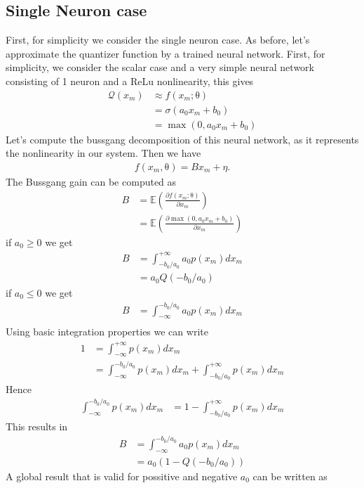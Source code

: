 \documentclass[12pt]{article}
\newcommand{\vect}[1]{\boldsymbol{\mathrm{#1}}}
\newcommand{\expt}[1]{\mathbb{E}\left(#1\right)}
\theoremstyle{remark}
\begin{document}
\subsection{Single Neuron case}
First, for simplicity we consider the single neuron case. As before, let's approximate the quantizer function by a trained neural network. First, for simplicity, we consider the scalar case and a very simple neural network consisting of 1 neuron and a ReLu nonlinearity, this gives
\begin{align}
	\mathcal{Q}(x_m) &\approx f(x_m; \vect{\theta})\\
	&= \sigma(a_0x_m + b_0)\\
	&= \max(0, a_0x_m + b_0)
\end{align}
Let's compute the bussgang decomposition of this neural network, as it represents the nonlinearity in our system. Then we have
\begin{align}
	f(x_m, \vect{\theta}) = B x_m + \eta.
\end{align}
The Bussgang gain can be computed as 
\begin{align}
	B &= \expt{\frac{\partial f(x_m; \vect{\theta})}{\partial x_m}}\\
	&= \expt{\frac{\partial \max(0, a_0x_m + b_0) }{\partial x_m}}
\end{align}
if $a_0\geq0$ we get 
\begin{align}
	B &=  \int_{-b_0/a_0}^{+\infty} a_0 p(x_m) dx_m \\
	&= a_0 Q(-b_0/a_0) 
\end{align}
if $a_0\leq0$ we get 
\begin{align}
	B &=  \int_{-\infty}^{-b_0/a_0} a_0 p(x_m) dx_m \\
\end{align}
Using basic integration properties we can write
\begin{align}
	1 &= \int_{-\infty}^{+\infty} p(x_m)dx_m\\
	&= \int_{-\infty}^{-b_0/a_0} p(x_m)dx_m + \int_{-b_0/a_0}^{+\infty} p(x_m)dx_m 
\end{align}
Hence
\begin{align}
	\int_{-\infty}^{-b_0/a_0} p(x_m)dx_m &= 1 - \int_{-b_0/a_0}^{+\infty} p(x_m)dx_m 
\end{align}
This results in 
\begin{align}
	B &= \int_{-\infty}^{-b_0/a_0} a_0 p(x_m) dx_m \\
	&= a_0 \left(1 - Q(-b_0/a_0)\right) 
\end{align}
A global result that is valid for possitive and negative $a_0$ can be written as
\end{document}
